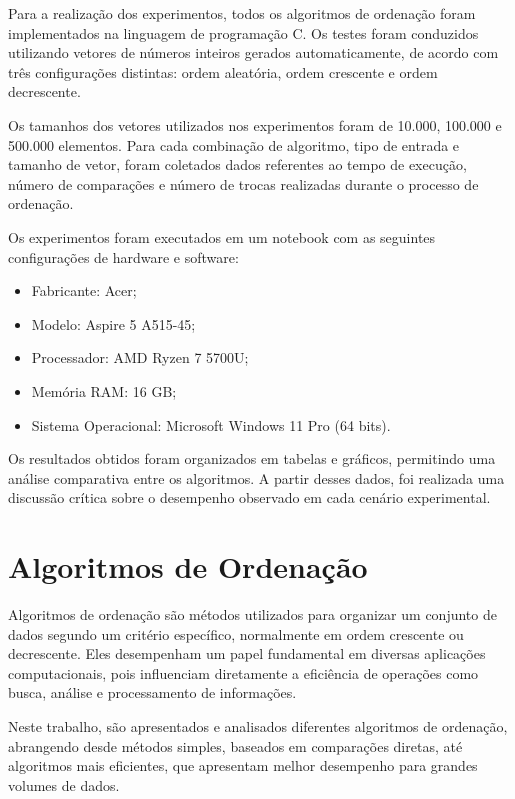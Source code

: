 \documentclass[12pt]{article}
\begin{document}
Para a realização dos experimentos, todos os algoritmos de ordenação foram
implementados na linguagem de programação C. Os testes foram conduzidos utilizando
vetores de números inteiros gerados automaticamente, de acordo com três configurações
distintas: ordem aleatória, ordem crescente e ordem decrescente.

Os tamanhos dos vetores utilizados nos experimentos foram de 10.000, 100.000 e
500.000 elementos. Para cada combinação
de algoritmo, tipo de entrada e tamanho de vetor, foram coletados dados referentes ao
tempo de execução, número de comparações e número de trocas realizadas durante o
processo de ordenação.

Os experimentos foram executados em um notebook com as seguintes configurações de
hardware e software:

\begin{itemize}
    \item Fabricante: Acer;
    \item Modelo: Aspire 5 A515-45;
    \item Processador: AMD Ryzen 7 5700U;
    \item Memória RAM: 16 GB;
    \item Sistema Operacional: Microsoft Windows 11 Pro (64 bits).
\end{itemize}

Os resultados obtidos foram organizados em tabelas e gráficos, permitindo uma análise
comparativa entre os algoritmos. A partir desses dados, foi realizada uma discussão
crítica sobre o desempenho observado em cada cenário experimental.

\section{Algoritmos de Ordenação}

Algoritmos de ordenação são métodos utilizados para organizar um conjunto de dados
segundo um critério específico, normalmente em ordem crescente ou decrescente. Eles
desempenham um papel fundamental em diversas aplicações computacionais, pois influenciam
diretamente a eficiência de operações como busca, análise e processamento de informações.

Neste trabalho, são apresentados e analisados diferentes algoritmos de ordenação,
abrangendo desde métodos simples, baseados em comparações diretas, até algoritmos mais
eficientes, que apresentam melhor desempenho para grandes volumes de dados.
\end{document}
